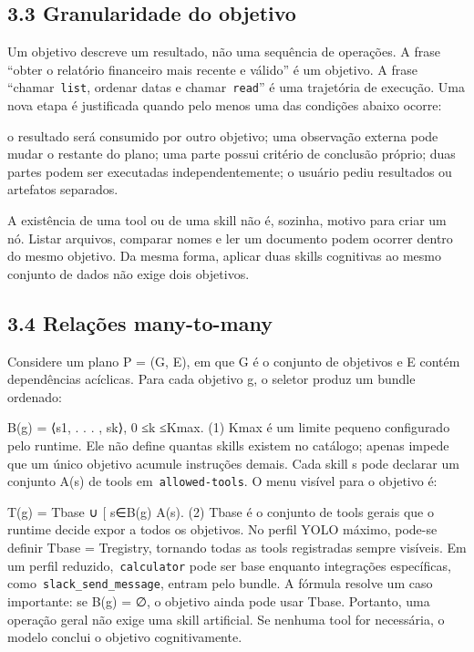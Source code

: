 \documentclass[12pt,a4paper]{article}
\begin{document}
\subsection*{3.3 Granularidade do objetivo}

Um objetivo descreve um resultado, não uma sequência de operações. A frase “obter o relatório financeiro mais recente e válido” é um objetivo. A frase “chamar\texttt{ list}, ordenar datas e chamar\texttt{ read}” é uma trajetória de execução. Uma nova etapa é justificada quando pelo menos uma das condições abaixo ocorre:


\noindent \textbullet{} o resultado será consumido por outro objetivo; \textbullet{} uma observação externa pode mudar o restante do plano; \textbullet{} uma parte possui critério de conclusão próprio; \textbullet{} duas partes podem ser executadas independentemente; \textbullet{} o usuário pediu resultados ou artefatos separados.\par

A existência de uma tool ou de uma skill não é, sozinha, motivo para criar um nó. Listar arquivos, comparar nomes e ler um documento podem ocorrer dentro do mesmo objetivo. Da mesma forma, aplicar duas skills cognitivas ao mesmo conjunto de dados não exige dois objetivos.



\subsection*{3.4 Relações many-to-many}

Considere um plano P = (G, E), em que G é o conjunto de objetivos e E contém dependências acíclicas. Para cada objetivo g, o seletor produz um bundle ordenado:


B(g) = ⟨s1, . . . , sk⟩, 0 ≤k ≤Kmax. (1) Kmax é um limite pequeno configurado pelo runtime. Ele não define quantas skills existem no catálogo; apenas impede que um único objetivo acumule instruções demais. Cada skill s pode declarar um conjunto A(s) de tools em\texttt{ allowed-tools}. O menu visível para o objetivo é:


T(g) = Tbase ∪ [ s∈B(g) A(s). (2) Tbase é o conjunto de tools gerais que o runtime decide expor a todos os objetivos. No perfil YOLO máximo, pode-se definir Tbase = Tregistry, tornando todas as tools registradas sempre visíveis. Em um perfil reduzido,\texttt{ calculator} pode ser base enquanto integrações específicas, como\texttt{ slack\_send\_message}, entram pelo bundle. A fórmula resolve um caso importante: se B(g) = ∅, o objetivo ainda pode usar Tbase. Portanto, uma operação geral não exige uma skill artificial. Se nenhuma tool for necessária, o modelo conclui o objetivo cognitivamente.
\end{document}
